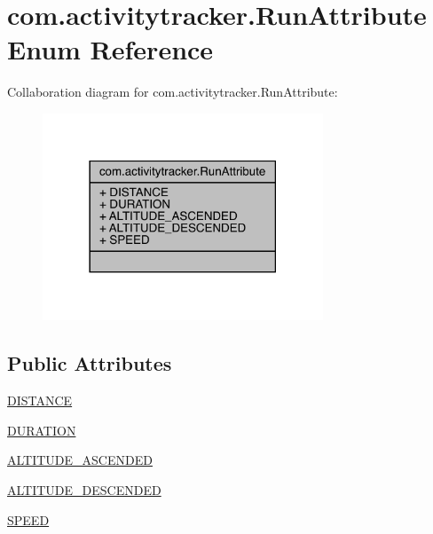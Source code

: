 \hypertarget{enumcom_1_1activitytracker_1_1_run_attribute}{}\section{com.\+activitytracker.\+Run\+Attribute Enum Reference}
\label{enumcom_1_1activitytracker_1_1_run_attribute}


Collaboration diagram for com.\+activitytracker.\+Run\+Attribute\+:
\nopagebreak
\begin{figure}[H]
\begin{center}
\leavevmode
\includegraphics[width=237pt]{enumcom_1_1activitytracker_1_1_run_attribute__coll__graph}
\end{center}
\end{figure}
\subsection*{Public Attributes}
\begin{DoxyCompactItemize}
\item 
\mbox{\hyperlink{enumcom_1_1activitytracker_1_1_run_attribute_a90ee541e68e458a0bb3f5ea45fd46ec0}{D\+I\+S\+T\+A\+N\+CE}}
\item 
\mbox{\hyperlink{enumcom_1_1activitytracker_1_1_run_attribute_a7adf133b2a62f1f99ffc2adfb7097ec9}{D\+U\+R\+A\+T\+I\+ON}}
\item 
\mbox{\hyperlink{enumcom_1_1activitytracker_1_1_run_attribute_abcfe85bf48187d67842a0525c1bcc0af}{A\+L\+T\+I\+T\+U\+D\+E\+\_\+\+A\+S\+C\+E\+N\+D\+ED}}
\item 
\mbox{\hyperlink{enumcom_1_1activitytracker_1_1_run_attribute_a337a68867cfdb8ec7a17c318ad8b216b}{A\+L\+T\+I\+T\+U\+D\+E\+\_\+\+D\+E\+S\+C\+E\+N\+D\+ED}}
\item 
\mbox{\hyperlink{enumcom_1_1activitytracker_1_1_run_attribute_a43fc543df9ec6dfaac73a5030abfafc4}{S\+P\+E\+ED}}
\end{DoxyCompactItemize}


